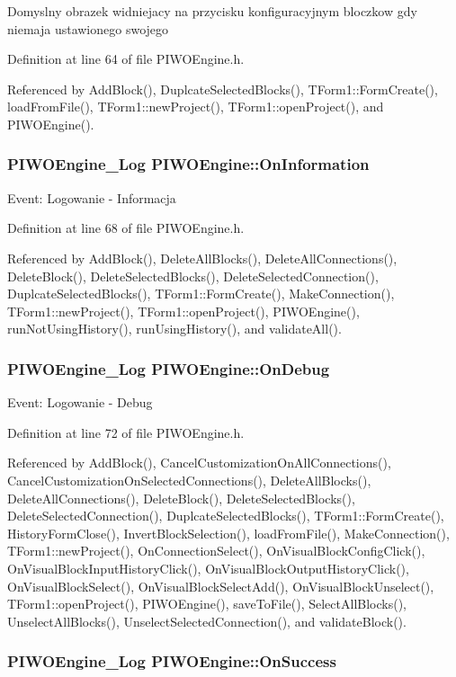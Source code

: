 Domyslny obrazek widniejacy na przycisku konfiguracyjnym bloczkow gdy niemaja ustawionego swojego 

Definition at line 64 of file PIWOEngine.h.

Referenced by AddBlock(), DuplcateSelectedBlocks(), TForm1::FormCreate(), loadFromFile(), TForm1::newProject(), TForm1::openProject(), and PIWOEngine().\hypertarget{classPIWOEngine_e5b5e665729db134c485ff27305b7888}{
\subsubsection[OnInformation]{\setlength{\rightskip}{0pt plus 5cm}PIWOEngine\_\-Log {\bf PIWOEngine::OnInformation}}}
\label{classPIWOEngine_e5b5e665729db134c485ff27305b7888}


Event: Logowanie - Informacja 

Definition at line 68 of file PIWOEngine.h.

Referenced by AddBlock(), DeleteAllBlocks(), DeleteAllConnections(), DeleteBlock(), DeleteSelectedBlocks(), DeleteSelectedConnection(), DuplcateSelectedBlocks(), TForm1::FormCreate(), MakeConnection(), TForm1::newProject(), TForm1::openProject(), PIWOEngine(), runNotUsingHistory(), runUsingHistory(), and validateAll().\hypertarget{classPIWOEngine_52bbb80846422f21ab9b03d67ad67a60}{
\subsubsection[OnDebug]{\setlength{\rightskip}{0pt plus 5cm}PIWOEngine\_\-Log {\bf PIWOEngine::OnDebug}}}
\label{classPIWOEngine_52bbb80846422f21ab9b03d67ad67a60}


Event: Logowanie - Debug 

Definition at line 72 of file PIWOEngine.h.

Referenced by AddBlock(), CancelCustomizationOnAllConnections(), CancelCustomizationOnSelectedConnections(), DeleteAllBlocks(), DeleteAllConnections(), DeleteBlock(), DeleteSelectedBlocks(), DeleteSelectedConnection(), DuplcateSelectedBlocks(), TForm1::FormCreate(), HistoryFormClose(), InvertBlockSelection(), loadFromFile(), MakeConnection(), TForm1::newProject(), OnConnectionSelect(), OnVisualBlockConfigClick(), OnVisualBlockInputHistoryClick(), OnVisualBlockOutputHistoryClick(), OnVisualBlockSelect(), OnVisualBlockSelectAdd(), OnVisualBlockUnselect(), TForm1::openProject(), PIWOEngine(), saveToFile(), SelectAllBlocks(), UnselectAllBlocks(), UnselectSelectedConnection(), and validateBlock().\hypertarget{classPIWOEngine_37a8c63dad516bc24be59cdca3a1eaa6}{
\subsubsection[OnSuccess]{\setlength{\rightskip}{0pt plus 5cm}PIWOEngine\_\-Log {\bf PIWOEngine::OnSuccess}}}
\label{classPIWOEngine_37a8c63dad516bc24be59cdca3a1eaa6}


